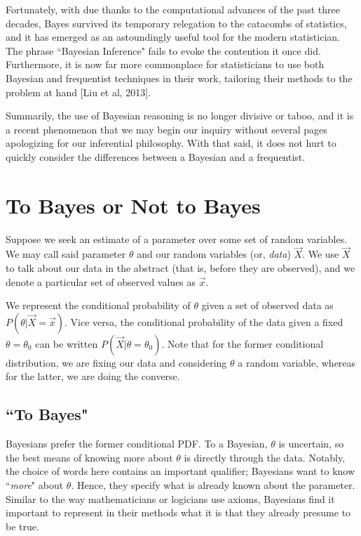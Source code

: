 \documentclass[12pt,twoside]{reedthesis}
\begin{document}
	Fortunately, with due thanks to the computational advances of the past three decades, Bayes survived its temporary relegation to the catacombs of statistics, and it has emerged as an astoundingly useful tool for the modern statistician. The phrase ``Bayesian Inference" fails to evoke the contention it once did. Furthermore, it is now far more commonplace for statisticians to use both Bayesian and frequentist techniques in their work, tailoring their methods to the problem at hand [Liu et al, 2013].
	
	Summarily, the use of Bayesian reasoning is no longer divisive or taboo, and it is a recent phenomenon that we may begin our inquiry without several pages apologizing for our inferential philosophy. With that said, it does not hurt to quickly consider the differences between a Bayesian and a frequentist. 
		
\section{To Bayes or Not to Bayes}

	Suppose we seek an estimate of a parameter over some set of random variables. We may call said parameter $\theta$ and our random variables (or, {\em data}) $\vec{X}$. We use $\vec{X}$ to talk about our data in the abstract (that is, before they are observed), and we denote a particular set of observed values as $\vec{x}$. 

	We represent the conditional probability of $\theta$ given a set of observed data as $P(\theta | \vec{X} = \vec{x})$. Vice versa, the conditional probability of the data given a fixed $\theta = \theta_0$ can be written $P(\vec{X} | \theta = \theta_0)$. Note that for the former conditional distribution, we are fixing our data and considering $\theta$ a random variable, whereas for the latter, we are doing the converse.

	\subsection*{``To Bayes"}
	Bayesians prefer the former conditional PDF. To a Bayesian, $\theta$ is uncertain, so the best means of knowing more about $\theta$ is directly through the data. Notably, the choice of words here contains an important qualifier; Bayesians want to know ``{\em more}" about $\theta$. Hence, they specify what is already known about the parameter. Similar to the way mathematicians or logicians use axioms, Bayesians find it important to represent in their methods what it is that they already presume to be true.
	
\end{document}

